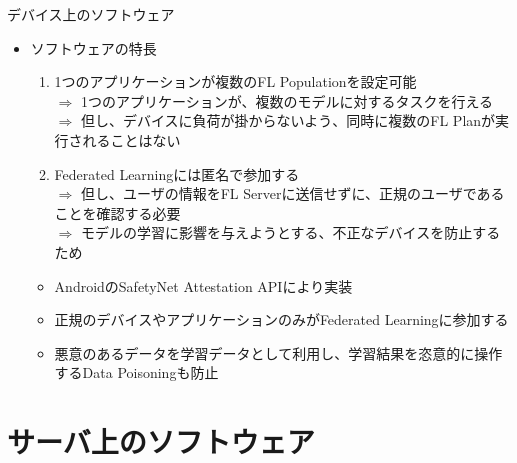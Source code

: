 \documentclass[dvipdfmx,notheorems,t]{beamer}
\begin{document}
\begin{frame}{デバイス上のソフトウェア}

\begin{itemize}
	\item ソフトウェアの特長
	\begin{enumerate}
		\item 1つのアプリケーションが複数のFL Populationを設定可能 \\
		$\Rightarrow$ 1つのアプリケーションが、複数のモデルに対するタスクを行える \\
		$\Rightarrow$ 但し、デバイスに負荷が掛からないよう、同時に複数のFL Planが実行されることはない
		\newline
		
		\item Federated Learningには匿名で参加する \\
		$\Rightarrow$ 但し、ユーザの情報をFL Serverに送信せずに、正規のユーザであることを確認する必要 \\
		$\Rightarrow$ モデルの学習に影響を与えようとする、不正なデバイスを防止するため
	\end{enumerate}
	
	\begin{itemize}
		\item AndroidのSafetyNet Attestation APIにより実装
		\item 正規のデバイスやアプリケーションのみがFederated Learningに参加する
		\item 悪意のあるデータを学習データとして利用し、学習結果を恣意的に操作する\alert{Data Poisoning}も防止
	\end{itemize}
\end{itemize}

\end{frame}

\section{サーバ上のソフトウェア}
\end{document}
